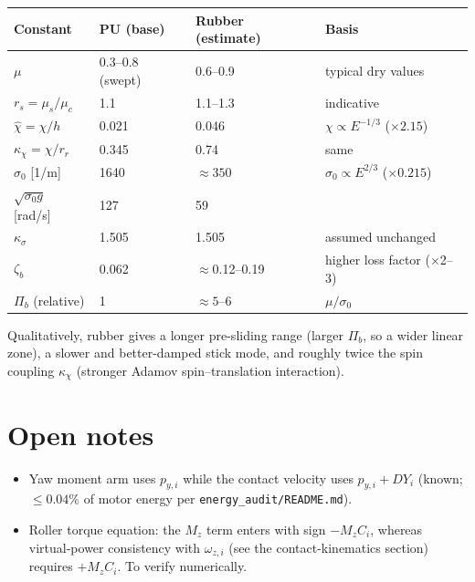 \documentclass[11pt]{article}
\begin{document}
\medskip
\begin{tabular}{@{}llll@{}}
\toprule
Constant & PU (base) & Rubber (estimate) & Basis \\
\midrule
$\mu$ & 0.3--0.8 (swept) & 0.6--0.9 & typical dry values \\
$r_s = \mu_s/\mu_c$ & 1.1 & 1.1--1.3 & indicative \\
$\hat\chi = \chi/h$ & 0.021 & 0.046 & $\chi\propto E^{-1/3}$ ($\times2.15$) \\
$\kappa_\chi = \chi/r_r$ & 0.345 & 0.74 & same \\
$\sigma_0$ [1/m] & 1640 & $\approx 350$ & $\sigma_0\propto E^{2/3}$ ($\times0.215$) \\
$\sqrt{\sigma_0 g}$ [rad/s] & 127 & 59 & \\
$\kappa_\sigma$ & 1.505 & 1.505 & assumed unchanged \\
$\zeta_b$ & 0.062 & $\approx$0.12--0.19 & higher loss factor ($\times$2--3) \\
$\Pi_b$ (relative) & 1 & $\approx 5$--6 & $\mu/\sigma_0$ \\
\bottomrule
\end{tabular}

\medskip
Qualitatively, rubber gives a longer pre-sliding range (larger $\Pi_b$, so a
wider linear zone), a slower and better-damped stick mode, and roughly twice the
spin coupling $\kappa_\chi$ (stronger Adamov spin--translation interaction).

\section*{Open notes}
\begin{itemize}
  \item Yaw moment arm uses $p_{y,i}$ while the contact velocity uses
    $p_{y,i} + DY_i$ (known; $\le 0.04\%$ of motor energy per
    \texttt{energy\_audit/README.md}).
  \item Roller torque equation: the $M_z$ term enters with sign $-M_z C_i$, whereas
    virtual-power consistency with $\omega_{z,i}$ (see the contact-kinematics
    section) requires $+M_z C_i$. To verify numerically.
\end{itemize}
\end{document}
